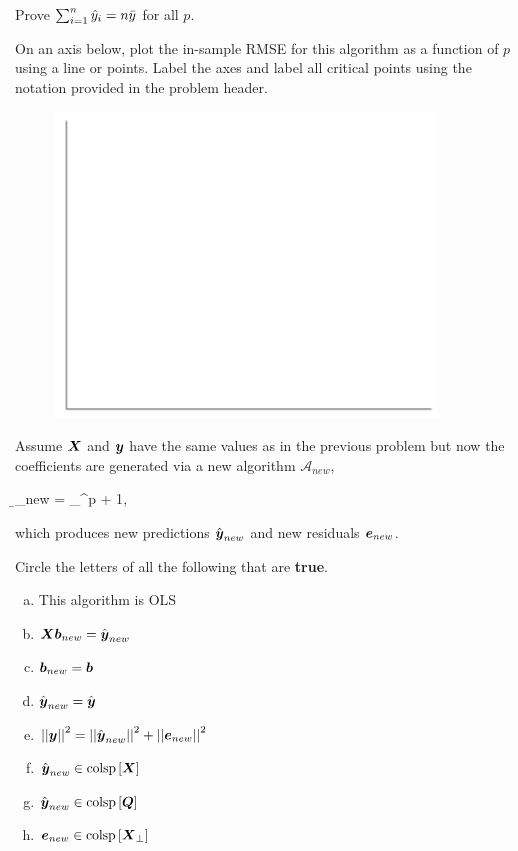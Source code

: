 \documentclass[12pt]{article}
\begin{document}
 Prove $\sum_{i=1}^n \hat{y}_i = n\bar{y}$ for all $p$.

 On an axis below, plot the in-sample RMSE for this algorithm as a function of $p$ using a line or points. Label the axes and label all critical points using the notation provided in the problem header.\\


\begin{figure}[htp]
\centering
\includegraphics[width=4in]{axes.png}
\end{figure}

\eenum


\problem Assume $\boldsymbol{X}$ and $\boldsymbol{y}$ have the same values as in the previous problem but now the coefficients are generated via a new algorithm $\mathcal{A}_{new}$,

\beqn
\b_{new} = \displaystyle\argmin_{\w \in \reals^{p + 1}},
\eeqn

\noindent which produces new predictions $\hat{\boldsymbol{y}}_{new}$ and new residuals $\boldsymbol{e}_{new}$.

\benum

 Circle the letters of all the following that are \textbf{true}.

\begin{enumerate}[(a)]
\item This algorithm is OLS
\item $\boldsymbol{X}\boldsymbol{b}_{new} = \hat{\boldsymbol{y}}_{new}$
\item $\boldsymbol{b}_{new} = \boldsymbol{b}$
\item $\hat{\boldsymbol{y}}_{new} = \hat{\boldsymbol{y}}$
\item $\left|\left|\boldsymbol{y}\right|\right|^2 = \left|\left|\hat{\boldsymbol{y}}_{new}\right|\right|^2 + \left|\left|\boldsymbol{e}_{new}\right|\right|^2$
\item $\hat{\boldsymbol{y}}_{new} \in \text{colsp}\left[\boldsymbol{X}\right]$
\item $\hat{\boldsymbol{y}}_{new} \in \text{colsp}\left[\boldsymbol{Q}\right]$
\item $\boldsymbol{e}_{new} \in \text{colsp}\left[\boldsymbol{X}_\perp\right]$
\end{enumerate}
\end{document}
